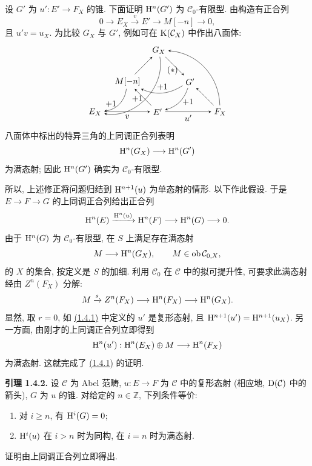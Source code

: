 设 \(G'\) 为 \(u':E'\to F_X\) 的锥. 下面证明 \(\mathrm H^n(G')\) 为 \(\mathcal C_0\)-有限型. 由构造有正合列
\[
  0\longrightarrow E_X\xrightarrow{v}E'\longrightarrow M[-n]\longrightarrow 0,
\]
且 \(u'v=u_X\). 为比较 \(G_X\) 与 \(G'\), 例如可在 \(\mathrm K(\mathcal C_X)\) 中作出八面体:
\[
\begin{tikzpicture}[>=stealth,baseline=(GX.base),node distance=1.0cm]
  \node (EX) at (0,0) {$E_X$};
  \node (Ep) at (2.6,0) {$E'$};
  \node (FX) at (5.2,0) {$F_X$};
  \node (M)  at (1.35,1.25) {$M[-n]$};
  \node (GX) at (2.65,2.55) {$G_X$};
  \node (Gp) at (3.95,1.25) {$G'$};
  \node at (3.22,1.72) {$(*)$};
  \draw[->] (EX) -- node[below] {$v$} (Ep);
  \draw[->] (Ep) -- node[below] {$u'$} (FX);
  \draw[->] (Ep) -- (M);
  \draw[->] (M) -- (GX);
  \draw[->] (GX) -- (Gp);
  \draw[->] (FX) -- (Gp);
  \draw[->] (M) to[bend left=38] node[left] {$+1$} (EX);
  \draw[->] (Gp) to[bend left=28] node[above] {$+1$} (M);
  \draw[->] (Gp) to[bend left=28] node[right] {$+1$} (Ep);
  \draw[->] (GX) to[bend left=55] node[left] {$+1$} (EX);
  \draw[->] (FX) to[bend right=42] (GX);
\end{tikzpicture}
\]
八面体中标出的特异三角的上同调正合列表明
\[
  \mathrm H^n(G_X)\longrightarrow \mathrm H^n(G')
\]
为满态射; 因此 \(\mathrm H^n(G')\) 确实为 \(\mathcal C_0\)-有限型.

所以, 上述修正将问题归结到 \(\mathrm H^{n+1}(u)\) 为单态射的情形. 以下作此假设. 于是 \(E\to F\to G\) 的上同调正合列给出正合列
\[
  \mathrm H^n(E)\xrightarrow{\mathrm H^n(u)}
  \mathrm H^n(F)\longrightarrow \mathrm H^n(G)\longrightarrow 0.
\]
由于 \(\mathrm H^n(G)\) 为 \(\mathcal C_0\)-有限型, 在 \(S\) 上满足存在满态射
\[
  M\longrightarrow \mathrm H^n(G_X),\qquad M\in\operatorname{ob}\mathcal C_{0,X},
\]
的 \(X\) 的集合, 按定义是 \(S\) 的加细. 利用 \(\mathcal C_0\) 在 \(\mathcal C\) 中的拟可提升性, 可要求此满态射经由 \(Z^n(F_X)\) 分解:
\[
  M\xrightarrow{s}Z^n(F_X)\longrightarrow \mathrm H^n(F_X)\longrightarrow \mathrm H^n(G_X).
\]
显然, 取 \(r=0\), 如 \hyperlink{sga6.e01.prop.1-4-1}{(1.4.1)} 中定义的 \(u'\) 是复形态射, 且 \(\mathrm H^{n+1}(u')=\mathrm H^{n+1}(u_X)\). 另一方面, 由刚才的上同调正合列立即得到
\[
  \mathrm H^n(u'):\mathrm H^n(E_X)\oplus M\longrightarrow \mathrm H^n(F_X)
\]
为满态射. 这就完成了 \hyperlink{sga6.e01.prop.1-4-1}{(1.4.1)} 的证明.

\textbf{引理 1.4.2.} 设 \(\mathcal C\) 为 Abel 范畴, \(u:E\to F\) 为 \(\mathcal C\) 中的复形态射 (相应地, \(\mathrm D(\mathcal C)\) 中的箭头), \(G\) 为 \(u\) 的锥. 对给定的 \(n\in\mathbb Z\), 下列条件等价:
\begin{enumerate}[label=(\roman*)]
\item 对 \(i\geq n\), 有 \(\mathrm H^i(G)=0\);
\item \(\mathrm H^i(u)\) 在 \(i>n\) 时为同构, 在 \(i=n\) 时为满态射.
\end{enumerate}
证明由上同调正合列立即得出.

